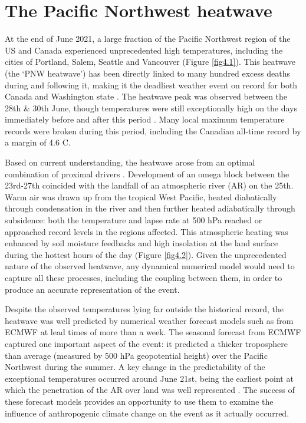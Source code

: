 \section{The Pacific Northwest heatwave}

  At the end of June 2021, a large fraction of the Pacific Northwest region of the US and Canada experienced unprecedented high temperatures, including the cities of Portland, Salem, Seattle and Vancouver (Figure \ref{fig4.1}). This heatwave (the `PNW heatwave') has been directly linked to many hundred excess deaths during and following it, making it the deadliest weather event on record for both Canada and Washington state \cite{henderson_analysis_2022}. The heatwave peak was observed between the 28th \& 30th June, though temperatures were still exceptionally high on the days immediately before and after this period \cite{menne_global_2012,menne_overview_2012}. Many local maximum temperature records were broken during this period, including the Canadian all-time record by a margin of 4.6 \textdegree{}C.

  Based on current understanding, the heatwave arose from an optimal combination of proximal drivers \cite{overland_causes_2021,lin_2021_2022,mo_anomalous_2022,white_unprecedented_2022}. Development of an omega block between the 23rd-27th coincided with the landfall of an atmospheric river (AR) on the 25th. Warm air was drawn up from the tropical West Pacific, heated diabatically through condensation in the river and then further heated adiabatically through subsidence: both the temperature and lapse rate at 500 hPa reached or approached record levels in the regions affected. This atmospheric heating was enhanced by soil moisture feedbacks \cite{thompson_2021_2022} and high insolation at the land surface during the hottest hours of the day (Figure \ref{fig4.2}). Given the unprecedented nature of the observed heatwave, any dynamical numerical model would need to capture all these processes, including the coupling between them, in order to produce an accurate representation of the event.
  
  Despite the observed temperatures lying far outside the historical record, the heatwave was well predicted by numerical weather forecast models such as from ECMWF at lead times of more than a week. The seasonal forecast from ECMWF captured one important aspect of the event: it predicted a thicker troposphere than average (measured by 500 hPa geopotential height) over the Pacific Northwest during the summer. A key change in the predictability of the exceptional temperatures occurred around June 21st, being the earliest point at which the penetration of the AR over land was well represented \cite{mo_anomalous_2022}. The success of these forecast models provides an opportunity to use them to examine the influence of anthropogenic climate change on the event as it actually occurred.

